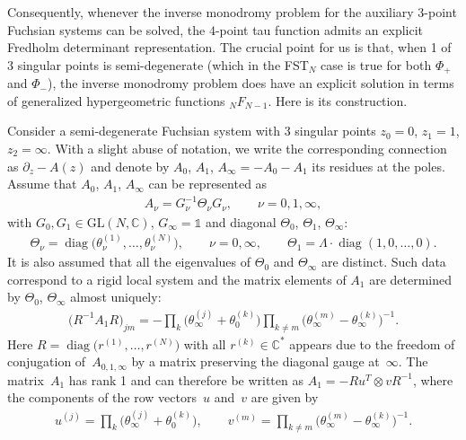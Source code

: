 \documentclass[pdftex]{sigma}
\newcommand\Cb{\mathbb{C}}
\numberwithin{equation}{section}
\begin{document}
Consequently, whenever the inverse monodromy problem for the auxiliary $3$-point Fuchsian systems can be solved, the $4$-point tau function admits an explicit Fredholm determinant representation. The crucial point for us is that, when 1 of 3 singular points is semi-degenerate (which in the FST$_N$ case is true for both $\Phi_+$ and $\Phi_-$), the inverse monodromy problem does have an explicit solution in terms of generalized hypergeometric functions $_NF_{N-1}$. Here is its construction.

Consider a semi-degenerate Fuchsian system with $3$ singular points $z_0=0$, $z_1=1$, $z_2=\infty$. With a slight abuse of notation, we write the corresponding connection as $\partial_z-A(z)$ and denote by $ A_0$, $ A_1$, $ A_\infty=- A_0- A_1$ its residues at the poles. Assume that $ A_0$, $ A_1$, $ A_\infty$ can be represented as
\begin{gather*} %
A_{\nu} = G_{\nu}^{-1} \Theta_{\nu} G_{\nu},\qquad \nu=0,1,\infty,
\end{gather*}
with $G_0,G_1\in \mathrm{GL}(N,\mathbb{C})$, $G_{\infty}=\mathds 1$ and diagonal $\Theta_0$, $\Theta_1$, $\Theta_\infty$:
\begin{gather*}%
\Theta_{\nu}=\operatorname{diag}\big(\theta^{(1)}_{\nu},\ldots,\theta^{(N)}_{\nu}\big),\qquad \nu=0,\infty,\qquad \Theta_1=\Lambda \cdot \operatorname{diag}(1,0,\ldots,0).
\end{gather*}
It is also assumed that all the eigenvalues of $\Theta_0$ and $\Theta_\infty$ are distinct. Such data correspond to a rigid local system and the matrix elements of $ A_1$ are determined by $\Theta_0$, $\Theta_{\infty}$ almost uniquely:
\begin{gather}\label{ME_Ajm}
\big(R^{-1} A_1 R\big)_{jm}=-\prod_{k}\big(\theta^{(j)}_\infty+\theta^{(k)}_0\big) \prod_{k\ne m}\big(\theta^{(m)}_\infty-\theta^{(k)}_\infty\big)^{-1}.
\end{gather}
Here $R=\operatorname{diag}\big(r^{(1)},\ldots,r^{(N)}\big)$ with all $r^{(k)}\in\Cb^*$ appears due to the freedom of conjugation of~$ A_{0,1,\infty}$ by a matrix preserving the diagonal gauge at~$\infty$. The matrix~$A_1$ has rank 1 and can therefore be written as $ A_1=-Ru^T\otimes vR^{-1}$, where the components of the row vectors~$u$ and~$v$ are given by
\begin{gather}\label{uvdeff}
u^{(j)}= \prod_{k}\big(\theta^{(j)}_\infty+\theta^{(k)}_0\big), \qquad v^{(m)} = \prod_{k\ne m}\big( \theta^{(m)}_\infty-\theta^{(k)}_\infty\big)^{-1}.
\end{gather}
\end{document}
